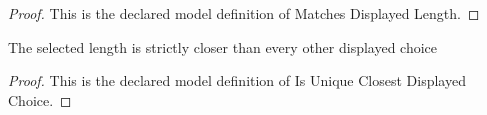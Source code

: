 \begin{proof}
  This is the declared model definition of Matches Displayed Length.
\end{proof}
\begin{definition}
  \label{def:physics:phyx-mini-0274:phyxminiproblems-problemphyxmini0274-isuniqueclosestdisplayedchoice}
  The selected length is strictly closer than every other displayed choice
\end{definition}
\begin{proof}
  This is the declared model definition of Is Unique Closest Displayed Choice.
\end{proof}
